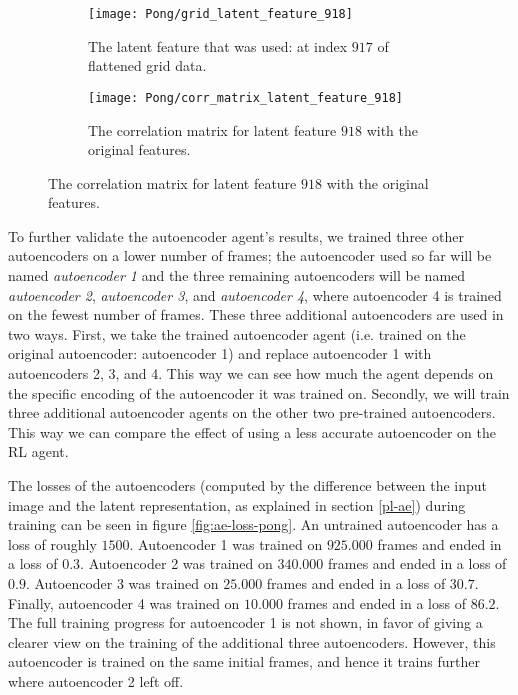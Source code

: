 \begin{figure}[h]
	\centering
	\begin{subfigure}[b]{0.2\textwidth}
		\texttt{[image: Pong/grid\_latent\_feature\_918]}
		\caption{The latent feature that was used: at index $917$ of flattened grid data.}
		\label{fig:ae-latent-feature-pong2} 
	\end{subfigure}\hfill
	\begin{subfigure}[b]{0.75\textwidth}
		\texttt{[image: Pong/corr\_matrix\_latent\_feature\_918]}
		\caption{The correlation matrix for latent feature $918$ with the original features.}
		\label{fig:ae-latent-feature-corr-matrix-pong2}
	\end{subfigure}
	\caption{The correlation matrix for latent feature $918$ with the original features.}
	\label{fig:latent-feature-corr-pong2}
\end{figure}

To further validate the autoencoder agent's results, we trained three other autoencoders on a lower number of frames; the autoencoder used so far will be named \emph{autoencoder 1} and the three remaining autoencoders will be named \emph{autoencoder 2}, \emph{autoencoder 3}, and \emph{autoencoder 4}, where autoencoder 4 is trained on the fewest number of frames. These three additional autoencoders are used in two ways. First, we take the trained autoencoder agent (i.e. trained on the original autoencoder: autoencoder 1) and replace autoencoder 1 with autoencoders 2, 3, and 4. This way we can see how much the agent depends on the specific encoding of the autoencoder it was trained on. Secondly, we will train three additional autoencoder agents on the other two pre-trained autoencoders. This way we can compare the effect of using a less accurate autoencoder on the RL agent.

The losses of the autoencoders (computed by the difference between the input image and the latent representation, as explained in section \ref{pl-ae}) during training can be seen in figure \ref{fig:ae-loss-pong}. An untrained autoencoder has a loss of roughly $1500$. Autoencoder 1 was trained on $925.000$ frames and ended in a loss of $0.3$. Autoencoder 2 was trained on $340.000$ frames and ended in a loss of $0.9$. Autoencoder 3 was trained on $25.000$ frames and ended in a loss of $30.7$. Finally, autoencoder 4 was trained on $10.000$ frames and ended in a loss of $86.2$. The full training progress for autoencoder 1 is not shown, in favor of giving a clearer view on the training of the additional three autoencoders. However, this autoencoder is trained on the same initial frames, and hence it trains further where autoencoder 2 left off.

